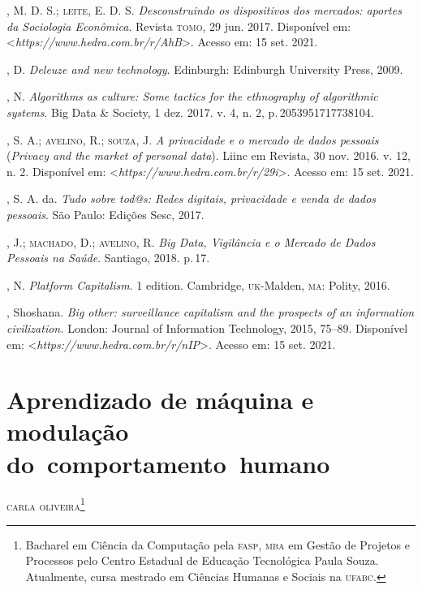 \begin{bibliohedra}
, M. D. S.; \textsc{leite}, E. D. S. \emph{Desconstruindo os
dispositivos dos mercados: aportes da Sociologia Econômica}. Revista
\textsc{tomo}, 29 jun. 2017. Disponível em: \textless{}\emph{https://www.hedra.com.br/r/AhB}\textgreater{}. Acesso em: 15 set. 2021.

, D. \emph{Deleuze and new technology}. Edinburgh: Edinburgh
University Press, 2009.

, N. \emph{Algorithms as culture: Some tactics for the
ethnography of algorithmic systems}. Big Data \& Society, 1 dez. 2017. v.
4, n. 2, p.\,2053951717738104.

, S. A.; \textsc{avelino}, R.; \textsc{souza}, J. \emph{A privacidade e o
mercado de dados pessoais} (\emph{Privacy and the market of personal
data}). Liinc em Revista, 30 nov. 2016. v. 12, n. 2. Disponível em:
\textless{}\emph{https://www.hedra.com.br/r/29i}\textgreater{}. Acesso em: 15 set. 2021.

, S. A. da. \emph{Tudo sobre tod@s: Redes digitais,
privacidade e venda de dados pessoais}. São Paulo: Edições Sesc, 2017.

, J.; \textsc{machado}, D.; \textsc{avelino}, R. \emph{Big Data, Vigilância e o
Mercado de Dados Pessoais na Saúde}. Santiago, 2018. p.\,17.

, N. \emph{Platform Capitalism}. 1 edition. Cambridge, \textsc{uk}-Malden,
\textsc{ma}: Polity, 2016.

, Shoshana. \emph{Big other: surveillance capitalism and the
prospects of an information civilization.} London: Journal of
Information Technology, 2015, 75--89. Disponível em: \textless{}\emph{https://www.hedra.com.br/r/nIP}\textgreater{}. Acesso em: 15 set. 2021.
\end{bibliohedra}


\chapter{Aprendizado de máquina e modulação do~comportamento~humano}


\begin{flushright}
\textsc{carla oliveira\footnote{Bacharel em Ciência da Computação pela \textsc{fasp}, \textsc{mba} em Gestão de Projetos e Processos pelo Centro Estadual de Educação Tecnológica Paula Souza. Atualmente, cursa mestrado em Ciências Humanas e Sociais na \textsc{ufabc}.}}
\end{flushright}


